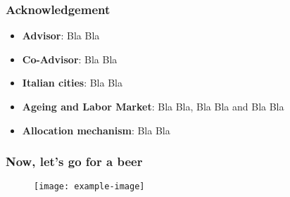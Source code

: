 \documentclass{beamer}
\begin{document}
\begin{frame}
\frametitle{Acknowledgement}
\begin{itemize}
\item \textbf{Advisor}: Bla Bla
\item \textbf{Co-Advisor}: Bla Bla
\item \textbf{Italian cities}: Bla Bla
\item \textbf{Ageing and Labor Market}: Bla Bla, Bla Bla and Bla Bla
\item \textbf{Allocation mechanism}: Bla Bla
\end{itemize}
\end{frame}

\begin{frame}
\frametitle{Now, let's go for a beer}
\begin{figure}[h]
\begin{center}
\texttt{[image: example-image]}
\end{center}
\end{figure}
\end{frame}
\end{document}
